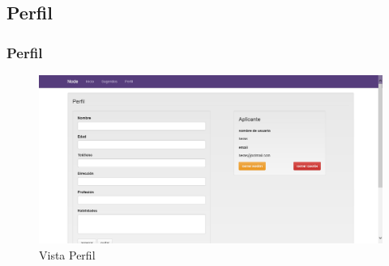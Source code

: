 \subsection{Perfil}
\frame
{
  \frametitle{Perfil}
  
	\begin{figure}[h]
	\begin{center}
	 	\includegraphics[scale=0.20]{./resources/vistas/perfil.png} 
		\caption{Vista Perfil}
	\end{center}
	\end{figure}
}